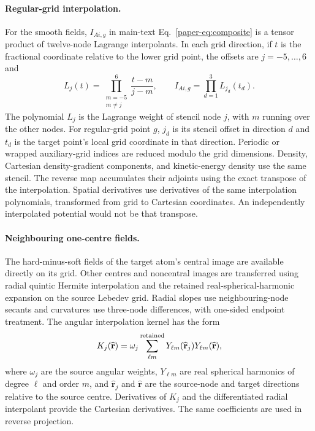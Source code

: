 \documentclass[10pt,a4paper]{article}
\begin{document}
\paragraph{Regular-grid interpolation.}
For the smooth fields, $I_{Ai,g}$ in main-text Eq.~\eqref{paper-eq:composite} is a tensor product of twelve-node Lagrange interpolants. In each grid direction, if $t$ is the fractional coordinate relative to the lower grid point, the offsets are $j=-5,\ldots,6$ and
\begin{equation}
 L_j(t)=\prod_{\substack{m=-5\\m\ne j}}^{6}\frac{t-m}{j-m},
 \qquad I_{Ai,g}=\prod_{d=1}^{3}L_{j_d}(t_d).
 \label{eq:smooth-interpolation}
\end{equation}
The polynomial $L_j$ is the Lagrange weight of stencil node $j$, with $m$ running over the other nodes. For regular-grid point $g$, $j_d$ is its stencil offset in direction $d$ and $t_d$ is the target point's local grid coordinate in that direction.
Periodic or wrapped auxiliary-grid indices are reduced modulo the grid dimensions. Density, Cartesian density-gradient components, and kinetic-energy density use the same stencil. The reverse map accumulates their adjoints using the exact transpose of the interpolation. Spatial derivatives use derivatives of the same interpolation polynomials, transformed from grid to Cartesian coordinates. An independently interpolated potential would not be that transpose.

\paragraph{Neighbouring one-centre fields.}
The hard-minus-soft fields of the target atom's central image are available directly on its grid. Other centres and noncentral images are transferred using radial quintic Hermite interpolation and the retained real-spherical-harmonic expansion on the source Lebedev grid. Radial slopes use neighbouring-node secants and curvatures use three-node differences, with one-sided endpoint treatment. The angular interpolation kernel has the form
\begin{equation}
 K_j(\widehat{\mathbf r})=\omega_j\sum_{\ell m}^{\rm retained}
 Y_{\ell m}(\widehat{\mathbf r}_j)Y_{\ell m}(\widehat{\mathbf r}),
 \label{eq:angular-interpolation}
\end{equation}
where $\omega_j$ are the source angular weights, $Y_{\ell m}$ are real spherical harmonics of degree $\ell$ and order $m$, and $\widehat{\mathbf r}_j$ and $\widehat{\mathbf r}$ are the source-node and target directions relative to the source centre. Derivatives of $K_j$ and the differentiated radial interpolant provide the Cartesian derivatives. The same coefficients are used in reverse projection.
\end{document}
